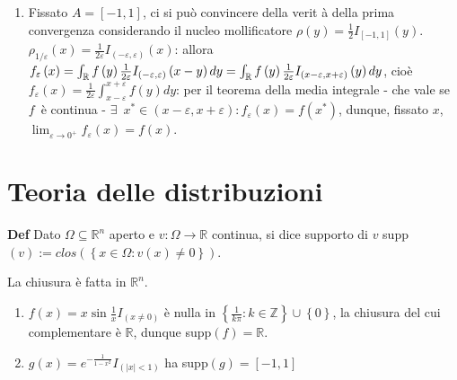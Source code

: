\documentclass{article}
\begin{document}
\begin{enumerate}
\item Fissato $A=\left[ -1,1\right] $, ci si pu\`{o} convincere della verit%
\`{a} della prima convergenza considerando il nucleo mollificatore $\rho
\left( y\right) =\frac{1}{2}I_{\left[ -1,1\right] }\left( y\right) $. $\rho
_{1/\varepsilon }\left( x\right) =\frac{1}{2\varepsilon }I_{\left(
-\varepsilon ,\varepsilon \right) }\left( x\right) $: allora $f_{\varepsilon
}\left( x\right) =\int_{%
\mathbb{R}
}f\left( y\right) \frac{1}{2\varepsilon }I_{\left( -\varepsilon ,\varepsilon
\right) }\left( x-y\right) dy=\int_{%
\mathbb{R}
}f\left( y\right) \frac{1}{2\varepsilon }I_{\left( x-\varepsilon
,x+\varepsilon \right) }\left( y\right) dy$, cio\`{e} $f_{\varepsilon
}\left( x\right) =\frac{1}{2\varepsilon }\int_{x-\varepsilon
}^{x+\varepsilon }f\left( y\right) dy$: per il teorema della media integrale
- che vale se $f$\ \`{e} continua - $\exists $\ $x^{\ast }\in \left(
x-\varepsilon ,x+\varepsilon \right) :f_{\varepsilon }\left( x\right)
=f\left( x^{\ast }\right) $, dunque, fissato $x$, $\lim_{\varepsilon
\rightarrow 0^{+}}f_{\varepsilon }\left( x\right) =f\left( x\right) $.
\end{enumerate}

\section{Teoria delle distribuzioni}

\textbf{Def} Dato $\Omega \subseteq 
\mathbb{R}
^{n}$ aperto e $v:\Omega \rightarrow 
\mathbb{R}
$ continua, si dice supporto di $v$ supp$\left( v\right) :=clos\left(
\left\{ x\in \Omega :v\left( x\right) \neq 0\right\} \right) $.

La chiusura \`{e} fatta in $%
\mathbb{R}
^{n}$.

\begin{enumerate}
\item $f\left( x\right) =x\sin \frac{1}{x}I_{\left( x\neq 0\right) }$ \`{e}
nulla in $\left\{ \frac{1}{k\pi }:k\in 
\mathbb{Z}
\right\} \cup \left\{ 0\right\} $, la chiusura del cui complementare \`{e} $%
\mathbb{R}
$, dunque supp$\left( f\right) =%
\mathbb{R}
$.

\item $g\left( x\right) =e^{-\frac{1}{1-x^{2}}}I_{\left( \left\vert
x\right\vert <1\right) }$ ha supp$\left( g\right) =\left[ -1,1\right] $
\end{enumerate}
\end{document}
